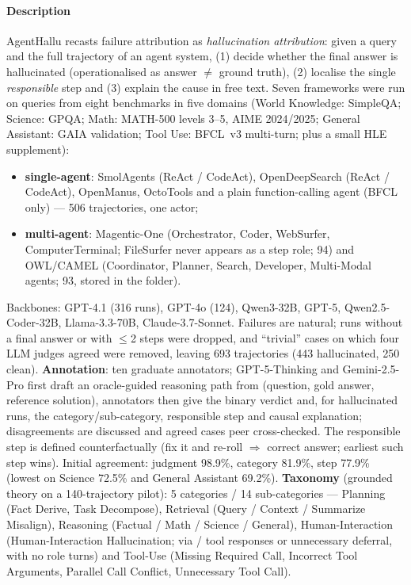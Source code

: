 \paragraph{Description} AgentHallu recasts failure attribution as \emph{hallucination attribution}: given a query and the full trajectory of an agent system, (1) decide whether the final answer is hallucinated (operationalised as answer $\neq$ ground truth), (2) localise the single \emph{responsible} step and (3) explain the cause in free text. Seven frameworks were run on queries from eight benchmarks in five domains (World Knowledge: SimpleQA; Science: GPQA; Math: MATH-500 levels 3--5, AIME 2024/2025; General Assistant: GAIA validation; Tool Use: BFCL~v3 multi-turn; plus a small HLE supplement):
\begin{itemize}
\item \textbf{single-agent}: SmolAgents (ReAct / CodeAct), OpenDeepSearch (ReAct / CodeAct), OpenManus, OctoTools and a plain function-calling agent (BFCL only) --- 506 trajectories, one actor;
\item \textbf{multi-agent}: Magentic-One (Orchestrator, Coder, WebSurfer, ComputerTerminal; FileSurfer never appears as a step role; 94) and OWL/CAMEL (Coordinator, Planner, Search, Developer, Multi-Modal agents; 93, stored in the  folder).
\end{itemize}
Backbones: GPT-4.1 (316 runs), GPT-4o (124), Qwen3-32B, GPT-5, Qwen2.5-Coder-32B, Llama-3.3-70B, Claude-3.7-Sonnet. Failures are natural; runs without a final answer or with $\le$2 steps were dropped, and ``trivial'' cases on which four LLM judges agreed were removed, leaving 693 trajectories (443 hallucinated, 250 clean). \textbf{Annotation}: ten graduate annotators; GPT-5-Thinking and Gemini-2.5-Pro first draft an oracle-guided reasoning path from (question, gold answer, reference solution), annotators then give the binary verdict and, for hallucinated runs, the category/sub-category, responsible step and causal explanation; disagreements are discussed and agreed cases peer cross-checked. The responsible step is defined counterfactually (fix it and re-roll $\Rightarrow$ correct answer; earliest such step wins). Initial agreement: judgment 98.9\%, category 81.9\%, step 77.9\% (lowest on Science 72.5\% and General Assistant 69.2\%). \textbf{Taxonomy} (grounded theory on a 140-trajectory pilot): 5 categories / 14 sub-categories --- Planning (Fact Derive, Task Decompose), Retrieval (Query / Context / Summarize Misalign), Reasoning (Factual / Math / Science / General), Human-Interaction (Human-Interaction Hallucination; via  /  tool responses or unnecessary deferral, with no  role turns) and Tool-Use (Missing Required Call, Incorrect Tool Arguments, Parallel Call Conflict, Unnecessary Tool Call).

